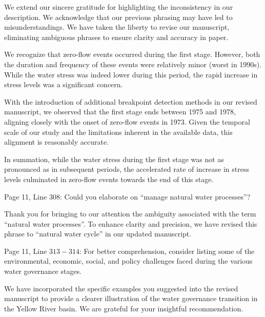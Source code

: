 \AR{} We extend our sincere gratitude for highlighting the inconsistency in our description. We acknowledge that our previous phrasing may have led to misunderstandings. We have taken the liberty to revise our manuscript, eliminating ambiguous phrases to ensure clarity and accuracy in paper.

\AR*{} We recognize that zero-flow events occurred during the first stage. However, both the duration and frequency of these events were relatively minor (worst in 1990s). While the water stress was indeed lower during this period, the rapid increase in stress levels was a significant concern.

\AR*{} With the introduction of additional breakpoint detection methods in our revised manuscript, we observed that the first stage ends between 1975 and 1978, aligning closely with the onset of zero-flow events in 1973. Given the temporal scale of our study and the limitations inherent in the available data, this alignment is reasonably accurate.

\AR*{} In summation, while the water stress during the first stage was not as pronounced as in subsequent periods, the accelerated rate of increase in stress levels culminated in zero-flow events towards the end of this stage.

\RC{} Page 11, Line 308: Could you elaborate on ``manage natural water processes''?

\AR{} Thank you for bringing to our attention the ambiguity associated with the term ``natural water processes''. To enhance clarity and precision, we have revised this phrase to ``natural water cycle'' in our updated manuscript.

\RC{} Page 11, Line $313-314$: For better comprehension, consider listing some of the environmental, economic, social, and policy challenges faced during the various water governance stages.

\AR{} We have incorporated the specific examples you suggested into the revised manuscript to provide a clearer illustration of the water governance transition in the Yellow River basin. We are grateful for your insightful recommendation.

